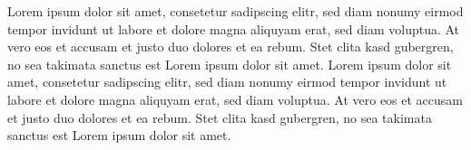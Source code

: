     \noindent  Lorem ipsum dolor sit amet, consetetur sadipscing elitr, sed diam nonumy eirmod tempor invidunt ut labore et dolore magna aliquyam erat, sed diam voluptua.
    At vero eos et accusam et justo duo dolores et ea rebum.
    Stet clita kasd gubergren, no sea takimata sanctus est Lorem ipsum dolor sit amet.
    Lorem ipsum dolor sit amet, consetetur sadipscing elitr, sed diam nonumy eirmod tempor invidunt ut labore et dolore magna aliquyam erat, sed diam voluptua.
    At vero eos et accusam et justo duo dolores et ea rebum.
    Stet clita kasd gubergren, no sea takimata sanctus est Lorem ipsum dolor sit amet. \medskip

\endgroup

\vspace*{-10cm}


\onehalfspacing